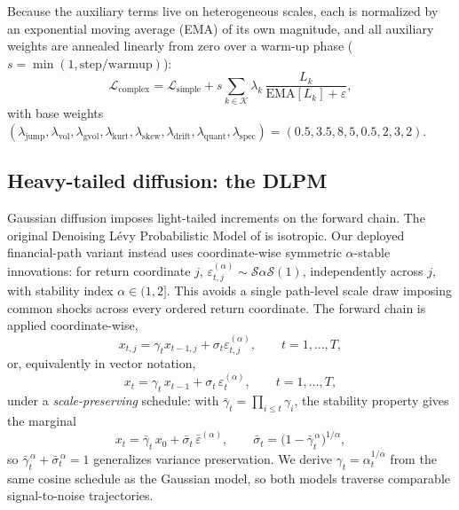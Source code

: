 ﻿\documentclass[12pt,letterpaper]{article}
\begin{document}
Because the auxiliary terms live on heterogeneous scales, each is normalized
by an exponential moving average (EMA) of its own magnitude, and all
auxiliary weights are annealed linearly from zero over a warm-up phase
($s = \min(1, \mathrm{step}/\mathrm{warmup})$):
\begin{equation}
\mathcal{L}_{\mathrm{complex}}
= \mathcal{L}_{\mathrm{simple}}
+ s \sum_{k \in \mathcal{K}} \lambda_k\,
\frac{L_k}{\mathrm{EMA}[L_k] + \varepsilon},
\label{eq:complex}
\end{equation}
with base weights
$(\lambda_{\mathrm{jump}}, \lambda_{\mathrm{vol}}, \lambda_{\mathrm{gvol}},
\lambda_{\mathrm{kurt}}, \lambda_{\mathrm{skew}}, \lambda_{\mathrm{drift}},
\lambda_{\mathrm{quant}}, \lambda_{\mathrm{spec}})
= (0.5, 3.5, 8, 5, 0.5, 2, 3, 2)$.

\subsection{Heavy-tailed diffusion: the DLPM}\label{sec:dlpm}

Gaussian diffusion imposes light-tailed increments on the forward chain. The
original Denoising L\'evy Probabilistic Model of
\citet{shariatian2024dlpm} is isotropic. Our deployed
financial-path variant instead uses coordinate-wise symmetric $\alpha$-stable
innovations: for return coordinate $j$,
$\varepsilon^{(\alpha)}_{t,j}\sim\mathcal{S}\alpha\mathcal{S}(1)$,
independently across $j$, with stability index $\alpha\in(1,2]$.
This avoids a single path-level scale draw imposing common shocks across every
ordered return coordinate. The forward chain is applied coordinate-wise,
\begin{equation}
x_{t,j} = \gamma_t x_{t-1,j} + \sigma_t\varepsilon^{(\alpha)}_{t,j},
\qquad t = 1, \dots, T,
\end{equation}
or, equivalently in vector notation,
\begin{equation}
x_t = \gamma_t\, x_{t-1} + \sigma_t\, \varepsilon_t^{(\alpha)},
\qquad t = 1, \dots, T,
\end{equation}
under a \emph{scale-preserving} schedule: with
$\bar\gamma_t = \prod_{i\le t}\gamma_i$, the stability property gives the
marginal
\begin{equation}
x_t = \bar\gamma_t\, x_0 + \bar\sigma_t\, \bar\varepsilon^{(\alpha)},
\qquad
\bar\sigma_t = \bigl(1 - \bar\gamma_t^{\,\alpha}\bigr)^{1/\alpha},
\end{equation}
so $\bar\gamma_t^{\,\alpha} + \bar\sigma_t^{\,\alpha} = 1$ generalizes
variance preservation. We derive $\gamma_t = \alpha_t^{1/\alpha}$ from the
same cosine schedule as the Gaussian model, so both models traverse
comparable signal-to-noise trajectories.
\end{document}
